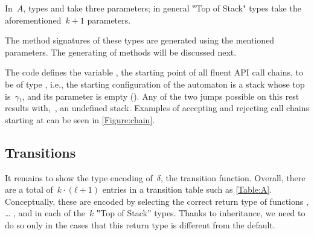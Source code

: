 \documentclass[a4paper,USenglish]{lipics-v2016}
\begin{document}
In~$A$, types  and  take three parameters;
in general ‟Top of Stack" types take the aforementioned~$k+1$ parameters.

The method signatures of these types are generated using the mentioned parameters.
The generating of methods will be discussed next.

The code defines the  variable , the starting point
of all fluent API call chains, to be of type , i.e.,
  the starting configuration of the automaton is a stack whose top is~$γ₁$,
  and its  parameter is empty ().
Any of the two jumps possible on this rest results with,~,
  an undefined stack.
Examples of accepting and rejecting call chains starting at 
  can be seen in \cref{Figure:chain}.

\subsection{Transitions}
It remains to show the type encoding of~$δ$,
  the transition function.
Overall, there are a total of~$k·(ℓ+1)$
  entries in a transition table such as \cref{Table:A}.
Conceptually, these are encoded by selecting the correct return
  type of functions , … , and \cc{\$()} in each
  of the~$k$ ‟Top of Stack” types.
Thanks to inheritance, we need to do so only in the cases that this
  return type is different from the default.
\end{document}
